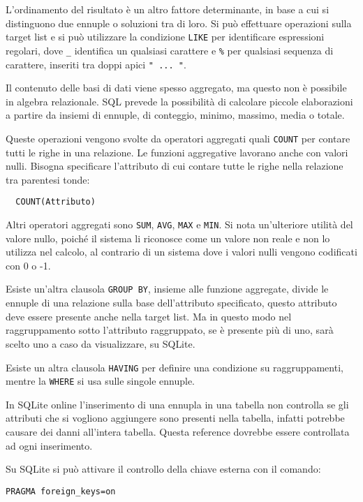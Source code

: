 \documentclass{article}
\numberwithin{equation}{subsection}
\begin{document}
L'ordinamento del risultato è un altro fattore determinante, in base a cui si distinguono due ennuple 
o soluzioni tra di loro. Si può effettuare operazioni sulla target list e si può utilizzare la condizione \verb|LIKE| per identificare espressioni regolari, dove 
\verb|_| identifica un qualsiasi carattere e \verb|%| per qualsiasi sequenza di carattere, inseriti tra doppi apici \verb|" ... "|. 

Il contenuto delle basi di dati viene spesso aggregato, ma questo non è possibile in algebra relazionale. SQL prevede la possibilità di calcolare piccole elaborazioni 
a partire da insiemi di ennuple, di conteggio, minimo, massimo, media o totale. 

Queste operazioni vengono svolte da operatori aggregati quali \verb|COUNT| per contare tutti le righe in una relazione. Le funzioni aggregative 
lavorano anche con valori nulli. Bisogna specificare l'attributo di cui contare tutte le righe nella relazione tra parentesi tonde:
\begin{verbatim}
  COUNT(Attributo)
\end{verbatim}
Altri operatori aggregati sono \verb|SUM|, \verb|AVG|, \verb|MAX| e \verb|MIN|. Si nota un'ulteriore utilità del valore nullo, poiché il sistema li 
riconosce come un valore non reale e non lo utilizza nel calcolo, al contrario di un sistema dove i valori nulli vengono codificati con 0 o -1. 

Esiste un'altra clausola \verb|GROUP BY|, insieme alle funzione aggregate, divide le ennuple di una relazione sulla base dell'attributo specificato, questo attributo deve 
essere presente anche nella target list. 
Ma in questo modo nel raggruppamento sotto l'attributo raggruppato, se è presente più di uno, sarà scelto uno a caso da visualizzare, su SQLite. 

Esiste un altra clausola \verb|HAVING| per definire una condizione su raggruppamenti, mentre la \verb|WHERE| si usa sulle singole ennuple. 


In SQLite online l'inserimento di una ennupla in una tabella non controlla se gli attributi che si vogliono aggiungere sono presenti nella tabella, infatti 
potrebbe causare dei danni all'intera tabella. Questa reference dovrebbe essere controllata ad ogni inserimento. 

Su SQLite si può attivare il controllo della chiave esterna con il comando:
\begin{verbatim}
PRAGMA foreign_keys=on
\end{verbatim}
\end{document}
